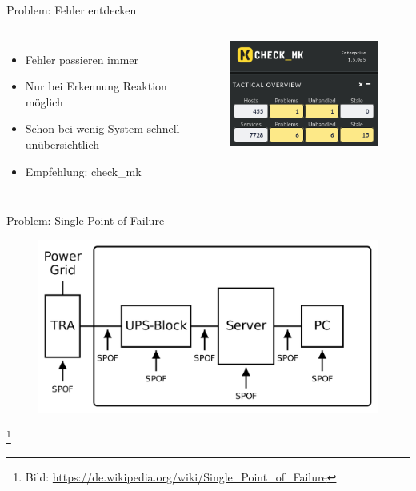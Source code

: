 \documentclass[10pt]{beamer}
\newcommand\blfootnote[1]{%
	\begingroup
	\renewcommand\thefootnote{}\footnote{#1}%
	\addtocounter{footnote}{-1}%
	\endgroup
}
\begin{document}
%
%
\begin{frame}[fragile]{Problem: Fehler entdecken}

\begin{columns}[T,c,onlytextwidth]
	\begin{itemize}
	\item Fehler passieren immer
	\item Nur bei Erkennung Reaktion möglich
	\item Schon bei wenig System schnell unübersichtlich
	\item Empfehlung: check\_mk
\end{itemize}
	\begin{figure}
		\includegraphics[width=1\textwidth]{images/omd}
	\end{figure}
\end{columns}
\end{frame}


%
%
\begin{frame}[fragile]{Problem: Single Point of Failure}
	\begin{figure}
	\includegraphics[width=1\textwidth]{images/spof1}
\end{figure}
\blfootnote{Bild: \href{https://de.wikipedia.org/wiki/Single_Point_of_Failure}{https://de.wikipedia.org/wiki/Single\_Point\_of\_Failure}}
\end{frame}
\end{document}

